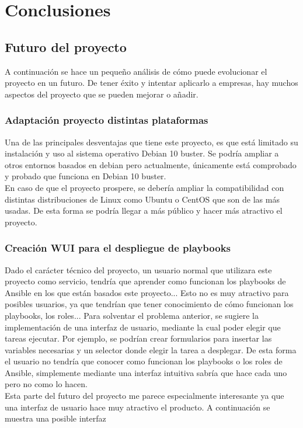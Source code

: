 \chapter {Conclusiones}


\section{Futuro del proyecto}
\begin{paragraph}
	A continuación se hace un pequeño análisis de cómo puede evolucionar el proyecto en un futuro. De tener éxito y intentar aplicarlo a empresas, hay muchos aspectos del proyecto que se pueden mejorar o añadir. 
\end{paragraph}
\subsection{Adaptación proyecto distintas plataformas}
\begin{paragraph}
	Una de las principales desventajas que tiene este proyecto, es que está limitado su instalación y uso al sistema operativo Debian 10 buster. Se podría ampliar a otros entornos basados en debian pero actualmente, únicamente está comprobado y probado que funciona en Debian 10 buster. \\
	En caso de que el proyecto prospere, se debería ampliar la compatibilidad con distintas distribuciones de Linux como Ubuntu o CentOS que son de las más usadas. De esta forma se podría llegar a más público y hacer más atractivo el proyecto.
\end{paragraph}
\subsection{Creación WUI para el despliegue de playbooks}
\begin{paragraph}
	Dado el carácter técnico del proyecto, un usuario normal que utilizara este proyecto como servicio, tendría que aprender como funcionan los playbooks de Ansible en los que están basados este proyecto... Esto no es muy atractivo para posibles usuarios, ya que tendrían que tener conocimiento de cómo funcionan los playbooks, los roles... Para solventar el problema anterior, se sugiere la implementación de una interfaz de usuario, mediante la cual poder elegir que tareas ejecutar. Por ejemplo, se podrían crear formularios para insertar las variables necesarias y un selector donde elegir la tarea a desplegar. De esta forma el usuario no tendría que conocer como funcionan los playbooks o los roles de Ansible, simplemente mediante una interfaz intuitiva sabría que hace cada uno pero no como lo hacen. \\
	Esta parte del futuro del proyecto me parece especialmente interesante ya que una interfaz de usuario hace muy atractivo el producto. A continuación se muestra una posible interfaz
\end{paragraph}
